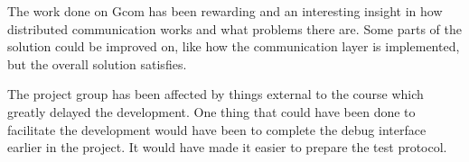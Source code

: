 The work done on Gcom has been rewarding and an interesting insight in how distributed communication works and what problems there are.
Some parts of the solution could be improved on, like how the communication layer is implemented, but the overall solution satisfies.

The project group has been affected by things external to the course which greatly delayed the development.
One thing that could have been done to facilitate the development would have been to complete the debug interface earlier in the project.
It would have made it easier to prepare the test protocol.
